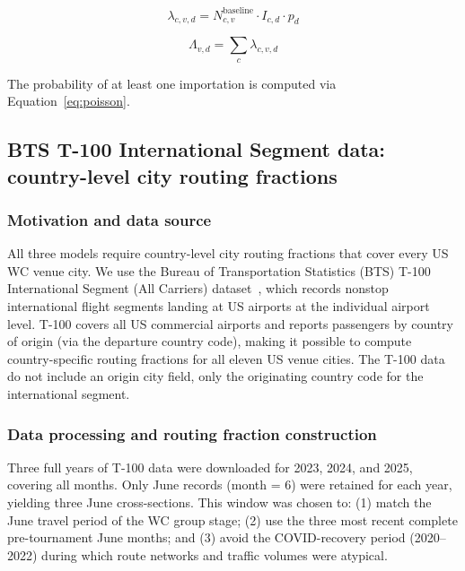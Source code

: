 \documentclass[12pt]{article}
\begin{document}
\begin{equation}
  \lambda_{c,v,d} = N_{c,v}^{\text{baseline}} \cdot I_{c,d} \cdot p_d
  \label{eq:lambda_baseline}
\end{equation}

\begin{equation}
  \Lambda_{v,d} = \sum_{c} \lambda_{c,v,d}
\end{equation}

The probability of at least one importation is computed via
Equation~\ref{eq:poisson}.

\subsection*{BTS T-100 International Segment data: country-level
city routing fractions}

\subsubsection*{Motivation and data source}

All three models require country-level city routing fractions that
cover every US WC venue city. We use the Bureau of Transportation
Statistics (BTS) T-100 International Segment (All Carriers)
dataset~\cite{BTS_T100}, which records nonstop international flight
segments landing at US airports at the individual airport level.
T-100 covers all US commercial airports and reports passengers by
country of origin (via the departure country code), making it
possible to compute country-specific routing fractions for all eleven
US venue cities. The T-100 data do not include an origin city field,
only the originating country code for the international segment.

\subsubsection*{Data processing and routing fraction construction}

Three full years of T-100 data were downloaded for 2023, 2024, and
2025, covering all months. Only June records (month = 6) were
retained for each year, yielding three June cross-sections. This
window was chosen to: (1) match the June travel period of the WC
group stage; (2) use the three most recent complete pre-tournament
June months; and (3) avoid the COVID-recovery period (2020--2022)
during which route networks and traffic volumes were atypical.
\end{document}

